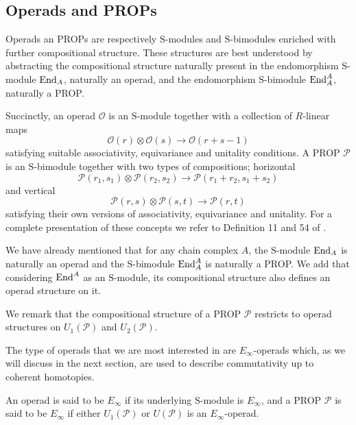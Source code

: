 \subsection{Operads and PROPs}

Operads an PROPs are respectively $\mathrm{S}$-modules and \mbox{$\mathrm{S}$-bimodules} enriched with further compositional structure. These structures are best understood by abstracting the compositional structure naturally present in the endomorphism $\mathrm{S}$-module $\mathrm{End}_A$, naturally an operad, and the endomorphism $\mathrm{S}$-bimodule $\mathrm{End}_A^A$, naturally a PROP.

Succinctly, an operad $\mathcal O$ is an $\mathrm{S}$-module together with a collection of $R$-linear maps
\begin{equation*}
\mathcal O(r) \otimes \mathcal O(s) \to \mathcal O(r+s-1)
\end{equation*}
satisfying suitable associativity, equivariance and unitality conditions. A PROP $\mathcal P$ is an $\mathrm{S}$-bimodule together with two types of compositions; horizontal
\begin{equation*}
\mathcal P(r_1, s_1) \otimes \mathcal P(r_2, s_2) \to \mathcal P(r_1 + r_2, s_1 + s_2)
\end{equation*}
and vertical
\begin{equation*}
\mathcal P(r,s) \otimes \mathcal P(s, t) \to \mathcal P(r, t)
\end{equation*}
satisfying their own versions of associativity, equivariance and unitality. For a complete presentation of these concepts we refer to Definition 11 and 54 of \cite{markl2008operads}.

We have already mentioned that for any chain complex $A$, the $\mathrm{S}$-module $\mathrm{End}_A$ is naturally an operad and the $\mathrm{S}$-bimodule $\mathrm{End}_A^A$ is naturally a PROP. We add that considering $\mathrm{End}^A$ as an $\mathrm{S}$-module, its compositional structure also defines an operad structure on it.

We remark that the compositional structure of a PROP $\mathcal P$ restricts to operad structures on $U_1(\mathcal P)$ and $U_2(\mathcal P)$.

The type of operads that we are most interested in are $E_\infty$-operads which, as we will discuss in the next section, are used to describe commutativity up to coherent homotopies.

\begin{definition} 
	An operad is said to be $E_\infty$ if its underlying \mbox{$\mathrm{S}$-module} is $E_\infty$, and a PROP $\mathcal P$ is said to be $E_\infty$ if either $U_1(\mathcal P)$ or $U(\mathcal P)$ is an \mbox{$E_\infty$-operad}.
\end{definition}

